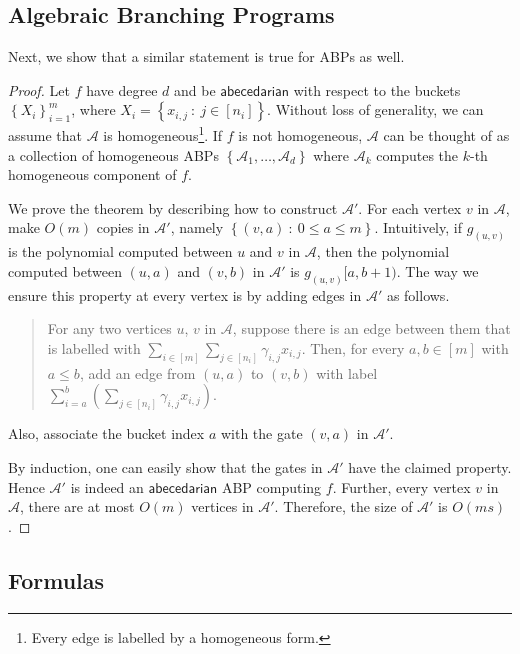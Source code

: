 \documentclass[10pt,a4paper]{article}
\def\set#1{\left\{ #1 \right\}}
\def\inparen#1{\left( #1 \right)}
\def\inbrace#1{\left\{ #1 \right\}}
\def\setdef#1#2{\inbrace{ #1 \ : \ #2}}
\newcommand{\abp}{\textbf{$\mathcal{A}$}}
\newcommand{\abcd}{\mathsf{abecedarian}}
\begin{document}
\subsection{Algebraic Branching Programs}\label{sec:orderABPs}

Next, we show that a similar statement is true for ABPs as well.

\orderABP*

\begin{proof}
	Let $f$ have degree $d$ and be $\abcd$ with respect to the buckets $\set{X_i}_{i=1}^{m}$, where $X_i = \setdef{x_{i,j}}{j \in [n_i]}$.	
	Without loss of generality, we can assume that $\abp$ is homogeneous\footnote{Every edge is labelled by a homogeneous form.}.
	If $f$ is not homogeneous, $\abp$ can be thought of as a collection of homogeneous ABPs $\set{\abp_1, \ldots, \abp_d}$ where $\abp_k$ computes the $k$-th homogeneous component of $f$. 
	
	We prove the theorem by describing how to construct $\abp'$. 
	For each vertex $v$ in $\abp$, make $O(m)$ copies in $\abp'$, namely $\setdef{(v, a)}{0 \leq a \leq m}$. 
	Intuitively, if $g_{(u,v)}$ is the polynomial computed between $u$ and $v$ in $\abp$, then the polynomial computed between $(u, a)$ and $(v, b)$ in $\abp'$ is $g_{(u,v)}[a,b+1)$.
	The way we ensure this property at every vertex is by adding edges in $\abp'$ as follows.
	
	\begin{quote}
		For any two vertices $u$, $v$ in $\abp$, suppose there is an edge between them that is labelled with $\sum_{i \in [m]} \sum_{j \in [n_i]} \gamma_{i,j} x_{i,j}.$ 
		Then, for every $a, b \in [m]$ with $a \leq b$, add an edge from $(u, a)$ to $(v, b)$ with label $\sum_{i = a}^{b} \inparen{\sum_{j \in [n_i]} \gamma_{i,j} x_{i,j}}$.
	\end{quote}

	\noindent Also, associate the bucket index $a$ with the gate $(v, a)$ in $\abp'$. 
	
	By induction, one can easily show that the gates in $\abp'$ have the claimed property.
	Hence $\abp'$ is indeed an $\abcd$ ABP computing $f$.
	Further, every vertex $v$ in $\abp$, there are at most $O(m)$ vertices in $\abp'$.
	Therefore, the size of $\abp'$ is $O(ms)$.
\end{proof}


\subsection{Formulas}\label{sec:orderForms}
\end{document}
